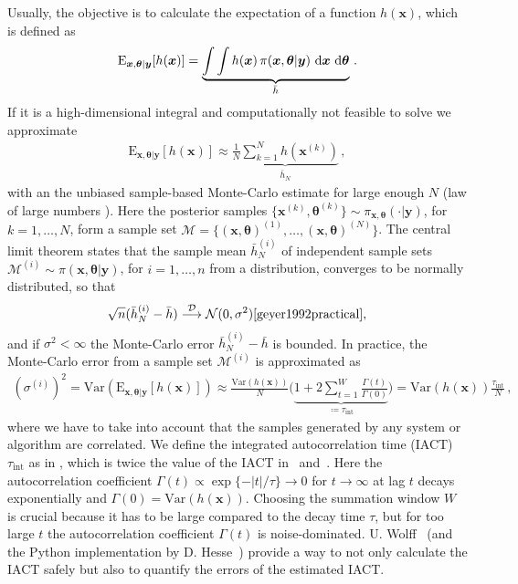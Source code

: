 Usually, the objective is to calculate the expectation of a function $h(\bm{x})$, which is defined as
\begin{align}
	\text{E}_{\bm{x},\bm{\theta}|\bm{y}} [h(\bm{x})] =  \underbrace{\int \int   h(\bm{x}) \,  \pi(\bm{x}, \bm{\theta} | \bm{y} ) \, \mathop{}\!\mathrm{d} \bm{x}  \, \mathop{}\!\mathrm{d} \bm{\theta}}_{\bar{h}}   \label{eq:expPos} \, .
\end{align}
If it is a high-dimensional integral and computationally not feasible to solve we approximate 
\begin{align}
	\label{eq:sampMean}
	\text{E}_{\bm{x},\bm{\theta}|\bm{y}} [h(\bm{x})] \approx \underbrace{ \frac{1}{N} \sum_{k=1}^{N} h(\bm{x}^{(k)})  }_{\bar{h}_N} \, ,
\end{align}
with an the unbiased sample-based Monte-Carlo estimate \cite{roberts2004general} for large enough $N$ (law of large numbers \cite[Chapter 17]{tweedie2009measprob}).
Here the posterior samples $\{\bm{x}^{(k)},\bm{\theta}^{(k)} \}\sim \pi_{\bm{x}, \bm{\theta}}(\cdot|\bm{y})$, for $k = 1, \dots, N$, form a sample set $\mathcal{M} =\{ (\bm{x},\bm{\theta})^{(1)}, \dots ,  (\bm{x},\bm{\theta})^{(N)} \}$.
The central limit theorem states that the sample mean $\bar{h}^{(i)}_N $ of independent sample sets $\mathcal{M}^{(i)}\sim\pi (\bm{x}, \bm{\theta}| \bm{y})$, for $i = 1, \dots, n$ from a distribution, converges to be normally distributed, so that
\begin{align}
	\sqrt{n} (\bar{h}^{(i)}_N -  \bar{h} ) \overset{\mathcal{D}}{\longrightarrow} \mathcal{N} (0,\sigma^2) \text{\cite{geyer1992practical}},
\end{align}
and if $\sigma^2 < \infty$ the Monte-Carlo error $\bar{h}^{(i)}_N -  \bar{h} $ is bounded.
In practice, the Monte-Carlo error from a sample set $\mathcal{M}^{(i)}$ is approximated as
\begin{align}
	(\sigma^{(i)})^2  =  \text{Var}(\text{E}_{\bm{x},\bm{\theta}|\bm{y}} [h(\bm{x})]) 
	\approx \frac{\text{Var}(h(\bm{x}) )}{N} \Bigg( \underbrace{  1 + 2 \sum_{t = 1}^{W} \frac{\Gamma(t)}{\Gamma(0)}  }_{ \coloneqq 	\tau_{\text{int}} }\Bigg) = \text{Var}(h(\bm{x})) \frac{ \tau_{\text{int}} }{N} \, , \label{eq:MCerr}
\end{align}
where we have to take into account that the samples generated by any system or algorithm are correlated.
We define the integrated autocorrelation time (IACT) $\tau_{\text{int}}$ as in \cite{fox2016fast}, which is twice the value of the IACT in~\cite[pp. 103-105]{wolff2002LecNot} and~\cite{wolff2004monte,drikHesse}.
Here the autocorrelation coefficient $\Gamma(t) \propto \exp\{ - |t| /\tau \} \longrightarrow 0$ for $t \rightarrow \infty$ at lag $t$ decays exponentially and $\Gamma(0) =\text{Var}(h(\bm{x}) ) $.
Choosing the summation window $W$ is crucial because it has to be large compared to the decay time $\tau$, but for too large $t$ the autocorrelation coefficient $\Gamma(t)$ is noise-dominated.
U. Wolff~\cite{wolff2004monte} (and the Python implementation by D. Hesse~\cite{drikHesse}) provide a way to not only calculate the IACT safely but also to quantify the errors of the estimated IACT.


